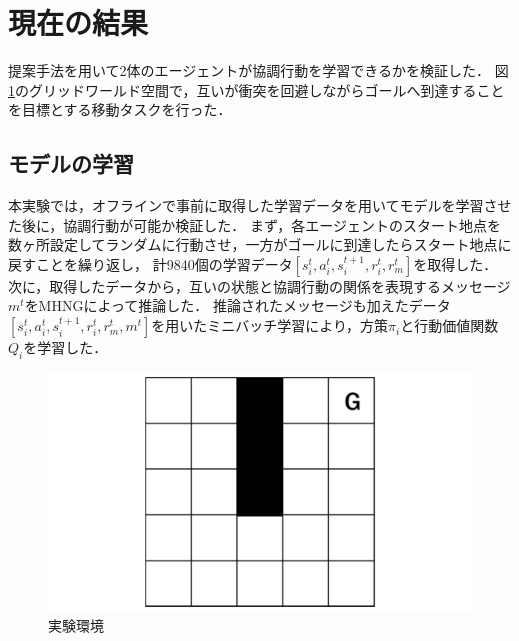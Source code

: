 \documentclass[twocolumn,a4j]{jarticle}
\begin{document}
\section{現在の結果}
提案手法を用いて2体のエージェントが協調行動を学習できるかを検証した．
図\ref{fig:world}のグリッドワールド空間で，互いが衝突を回避しながらゴールへ到達することを目標とする移動タスクを行った．

\subsection{モデルの学習}
\label{3.2}
本実験では，オフラインで事前に取得した学習データを用いてモデルを学習させた後に，協調行動が可能か検証した．
まず，各エージェントのスタート地点を数ヶ所設定してランダムに行動させ，一方がゴールに到達したらスタート地点に戻すことを繰り返し，
計9840個の学習データ$[s^t_{i},a^t_{i},s^{t+1}_{i},r^{t}_{i},r^{t}_{m}]$を取得した．
次に，取得したデータから，互いの状態と協調行動の関係を表現するメッセージ$m^t$をMHNGによって推論した．
推論されたメッセージも加えたデータ$[s^t_{i},a^t_{i},s^{t+1}_{i},r^{t}_{i},r^{t}_{m},m^t]$を用いたミニバッチ学習により，方策$\pi_{i}$と行動価値関数$Q_{i}$を学習した．

\begin{figure}[t]
\centering
\includegraphics[scale=0.2]{fig/world.pdf}
\caption{実験環境}
\label{fig:world}
\end{figure}
\end{document}
